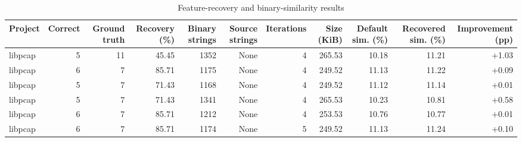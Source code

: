 \begin{table}[htbp]
\centering
\caption{Feature-recovery and binary-similarity results}
\label{tab:feature-recovery-results}
\small
\begin{tabular}{lrrrrrrrrrr}
\toprule
Project & Correct & Ground truth & Recovery (\%) & Binary strings & Source strings & Iterations & Size (KiB) & Default sim. (\%) & Recovered sim. (\%) & Improvement (pp) \\
\midrule
libpcap & 5 & 11 & 45.45 & 1352 & None & 4 & 265.53 & 10.18 & 11.21 & +1.03 \\
libpcap & 6 & 7 & 85.71 & 1175 & None & 4 & 249.52 & 11.13 & 11.22 & +0.09 \\
libpcap & 5 & 7 & 71.43 & 1168 & None & 4 & 249.52 & 11.12 & 11.14 & +0.01 \\
libpcap & 5 & 7 & 71.43 & 1341 & None & 4 & 265.53 & 10.23 & 10.81 & +0.58 \\
libpcap & 6 & 7 & 85.71 & 1212 & None & 4 & 253.53 & 10.76 & 10.77 & +0.01 \\
libpcap & 6 & 7 & 85.71 & 1174 & None & 5 & 249.52 & 11.13 & 11.24 & +0.10 \\
\bottomrule
\end{tabular}
\end{table}
